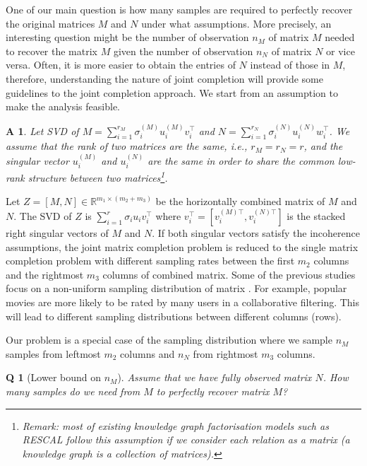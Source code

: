 \documentclass{article} %
\newtheorem{assumption}{A}
\newtheorem{question}{Q}
\begin{document}
One of our main question is how many samples are required to perfectly recover the original matrices $M$ and $N$ under what assumptions. More precisely, an interesting question might be the number of observation $n_M$ of matrix $M$ needed to recover the matrix $M$ given the number of observation $n_N$ of matrix $N$ or vice versa. Often, it is more easier to obtain the entries of $N$ instead of those in $M$, therefore, understanding the nature of joint completion will provide some guidelines to the joint completion approach. We start from an assumption to make the analysis feasible.

\begin{assumption}\label{assume:share}
Let SVD of $M = \sum_{i=1}^{r_M} \sigma_i^{(M)} u_i^{(M)} v_i^\top$ and $N = \sum_{i=1}^{r_N} \sigma_i^{(N)} u_i^{(N)} w_i^\top$. We assume that the rank of two matrices are the same, i.e., $r_M = r_N = r$, and the singular vector $u_i^{(M)}$ and $u_i^{(N)}$ are the same in order to share the common low-rank structure between two matrices\footnote{Remark: most of existing knowledge graph factorisation models such as RESCAL follow this assumption if we consider each relation as a matrix (a knowledge graph is a collection of matrices).}.
\end{assumption}

Let $Z = [M, N] \in \mathbb{R}^{m_1 \times (m_2+m_3)}$ be the horizontally combined matrix of $M$ and $N$. The SVD of $Z$ is $\sum_{i=1}^{r}\sigma_i u_i v_i^\top$ where $v_i^\top = [v_i^{(M)\top}, v_i^{(N)\top}]$ is the stacked right singular vectors of $M$ and $N$. If both singular vectors satisfy the incoherence assumptions, the joint matrix completion problem is reduced to the single matrix completion problem with different sampling rates between the first $m_2$ columns and the rightmost $m_3$ columns of combined matrix. Some of the previous studies focus on a non-uniform sampling distribution of matrix \cite{foygel2011learning,lounici2011optimal,negahban2012restricted,klopp2014noisy}. For example, popular movies are more likely to be rated by many users in a collaborative filtering. This will lead to different sampling distributions between different columns (rows). 

Our problem is a special case of the sampling distribution where we sample $n_M$ samples from leftmost $m_2$ columns and $n_N$ from rightmost $m_3$ columns.

\begin{question}[Lower bound on $n_M$]
Assume that we have fully observed matrix $N$. How many samples do we need from $M$ to perfectly recover matrix $M$?
\end{question}
\end{document}

